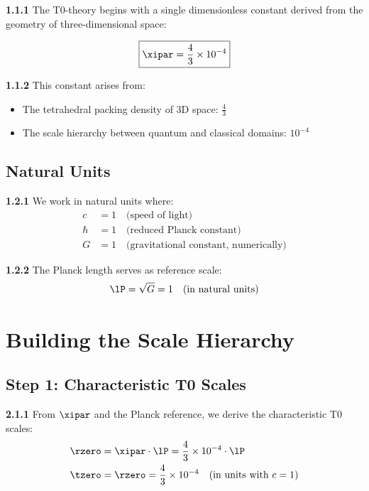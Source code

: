 	\noindent \textbf{1.1.1} The T0-theory begins with a single dimensionless constant derived from the geometry of three-dimensional space:
	
	\begin{keyresult}
		\begin{equation}
			\boxed{\xipar = \frac{4}{3} \times 10^{-4}}
		\end{equation}
	\end{keyresult}
	
	\noindent \textbf{1.1.2} This constant arises from:
	\begin{itemize}
		\item The tetrahedral packing density of 3D space: $\frac{4}{3}$
		\item The scale hierarchy between quantum and classical domains: $10^{-4}$
	\end{itemize}
	
	\subsection{Natural Units}
	
	\noindent \textbf{1.2.1} We work in natural units where:
	\begin{align}
		c &= 1 \quad \text{(speed of light)} \\
		\hbar &= 1 \quad \text{(reduced Planck constant)} \\
		G &= 1 \quad \text{(gravitational constant, numerically)}
	\end{align}
	
	\noindent \textbf{1.2.2} The Planck length serves as reference scale:
	\begin{equation}
		\lP = \sqrt{G} = 1 \quad \text{(in natural units)}
	\end{equation}
	
	\section{Building the Scale Hierarchy}
	
	\subsection{Step 1: Characteristic T0 Scales}
	
	\noindent \textbf{2.1.1} From $\xipar$ and the Planck reference, we derive the characteristic T0 scales:
	\begin{align}
		\rzero &= \xipar \cdot \lP = \frac{4}{3} \times 10^{-4} \cdot \lP \\
		\tzero &= \rzero = \frac{4}{3} \times 10^{-4} \quad \text{(in units with } c=1\text{)}
	\end{align}
	
